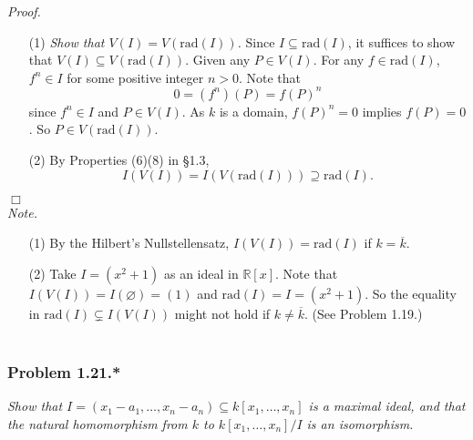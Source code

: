 \documentclass{article}
\begin{document}
\emph{Proof.}
\begin{enumerate}
\item[(1)]
  \emph{Show that $V(I) = V(\mathrm{rad}(I))$.}
  Since $I \subseteq \mathrm{rad}(I)$,
  it suffices to show that $V(I) \subseteq V(\mathrm{rad}(I))$.
  Given any $P \in V(I)$.
  For any $f \in \mathrm{rad}(I)$, $f^n \in I$ for some positive integer $n > 0$.
  Note that
  \[
    0 = (f^n)(P) = f(P)^n
  \]
  since $f^n \in I$ and $P \in V(I)$.
  As $k$ is a domain, $f(P)^n = 0$ implies $f(P) = 0$. So $P \in V(\mathrm{rad}(I))$.

\item[(2)]
  By Properties (6)(8) in \S 1.3,
  \[
    I(V(I)) = I(V(\mathrm{rad}(I))) \supseteq \mathrm{rad}(I).
  \]
\end{enumerate}
$\Box$ \\

\emph{Note.}
\begin{enumerate}
\item[(1)]
  By the Hilbert's Nullstellensatz, $I(V(I)) = \mathrm{rad}(I)$ if $k = \overline{k}$.

\item[(2)]
  Take $I = (x^2+1)$ as an ideal in $\mathbb{R}[x]$.
  Note that $I(V(I))= I(\varnothing) = (1)$ and $\mathrm{rad}(I) = I = (x^2+1)$.
  So the equality in $\mathrm{rad}(I) \subsetneq I(V(I))$ might not hold
  if $k \neq \overline{k}$.
  (See Problem 1.19.) \\\\
\end{enumerate}






\subsubsection*{Problem 1.21.*}
\emph{Show that
$I=(x_1-a_1, \ldots, x_n-a_n) \subseteq k[x_1,\ldots,x_n]$ is a maximal ideal,
and that the natural homomorphism from $k$ to $k[x_1,\ldots,x_n]/I$ is an isomorphism.} \\
\end{document}
